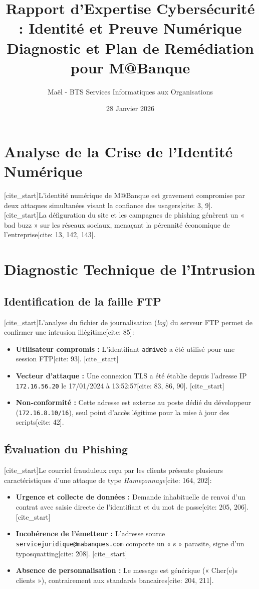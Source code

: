\documentclass[a4paper,11pt]{article}
\title{\textbf{Rapport d'Expertise Cybersécurité : Identité et Preuve Numérique}\\ \Large Diagnostic et Plan de Remédiation pour M@Banque}
\author{Maël - BTS Services Informatiques aux Organisations}
\date{28 Janvier 2026}
\begin{document}
\maketitle

\section{Analyse de la Crise de l'Identité Numérique}
[cite_start]L'identité numérique de M@Banque est gravement compromise par deux attaques simultanées visant la confiance des usagers[cite: 3, 9]. [cite_start]La défiguration du site et les campagnes de phishing génèrent un « bad buzz » sur les réseaux sociaux, menaçant la pérennité économique de l'entreprise[cite: 13, 142, 143].

\section{Diagnostic Technique de l'Intrusion}

\subsection{Identification de la faille FTP}
[cite_start]L'analyse du fichier de journalisation (\textit{log}) du serveur FTP permet de confirmer une intrusion illégitime[cite: 85]:
\begin{itemize}
    [cite_start]\item \textbf{Utilisateur compromis :} L'identifiant \texttt{admiweb} a été utilisé pour une session FTP[cite: 93].
    [cite_start]\item \textbf{Vecteur d'attaque :} Une connexion TLS a été établie depuis l'adresse IP \texttt{172.16.56.20} le 17/01/2024 à 13:52:57[cite: 83, 86, 90].
    [cite_start]\item \textbf{Non-conformité :} Cette adresse est externe au poste dédié du développeur (\texttt{172.16.8.10/16}), seul point d'accès légitime pour la mise à jour des scripts[cite: 42].
\end{itemize}

\subsection{Évaluation du Phishing}
[cite_start]Le courriel frauduleux reçu par les clients présente plusieurs caractéristiques d'une attaque de type \textit{Hameçonnage}[cite: 164, 202]:
\begin{itemize}
    [cite_start]\item \textbf{Urgence et collecte de données :} Demande inhabituelle de renvoi d'un contrat avec saisie directe de l'identifiant et du mot de passe[cite: 205, 206].
    [cite_start]\item \textbf{Incohérence de l'émetteur :} L'adresse source \texttt{servicejuridique@mabanques.com} comporte un « s » parasite, signe d'un typosquatting[cite: 208].
    [cite_start]\item \textbf{Absence de personnalisation :} Le message est générique (« Cher(e)s clients »), contrairement aux standards bancaires[cite: 204, 211].
\end{itemize}
\end{document}
